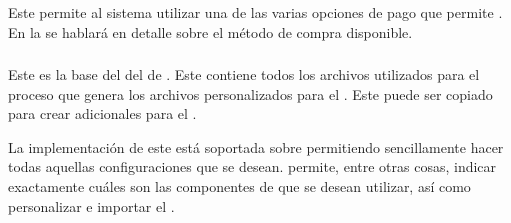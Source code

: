		\subsubsection{\eframeworkPaypalPCKG}
			Este \packagesAS permite al sistema utilizar una de las varias opciones de pago que permite \paypalNAME. En la  se hablará en detalle sobre el método de compra disponible.


		\subsubsection{\eframeworkCoreThemePCKG}\label{chapter:section:subsection:package_core_theme}

		Este \packagesAS es la base del \bootstrap \themeCPT del \frameworkPC de \ecommerceCOM. Este contiene todos los archivos \lessNAME utilizados para el proceso que genera los archivos \lessNAME personalizados para el \frameworkPC. Este \packagesAS puede ser copiado para crear \themeCPT adicionales para el \frameworkPC \ecommerceCOM.

		La implementación de este \packagesAS está soportada sobre \bootstrapPackage permitiendo sencillamente hacer todas aquellas configuraciones que se desean. \bootstrapPackage permite, entre otras cosas, indicar exactamente cuáles son las componentes de \bootstrapNAME que se desean utilizar, así como personalizar e importar el \themeCPT.
			
			

		